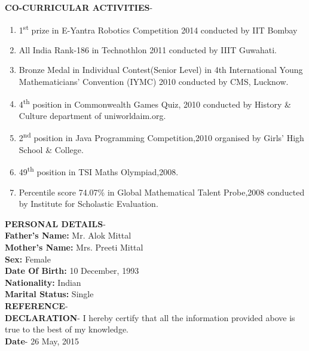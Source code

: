 \documentclass{article}
\begin{document}
	\textbf{CO-CURRICULAR ACTIVITIES}-
	\begin{enumerate}
		\item 1\textsuperscript{st} prize in E-Yantra Robotics Competition 2014 conducted by IIT Bombay
		\item All India Rank-186 in Technothlon 2011 conducted by IIIT Guwahati.
		\item Bronze Medal in Individual Contest(Senior Level) in 4th International Young Mathematicians' Convention (IYMC) 2010 conducted by CMS, Lucknow.
		\item 4\textsuperscript{th} position in Commonwealth Games Quiz, 2010 conducted by History & Culture department of uniworldaim.org.
		\item 2\textsuperscript{nd} position in Java Programming Competition,2010 organised by Girls' High School \& College.
		\item 49\textsuperscript{th} position in TSI Maths Olympiad,2008.
		\item Percentile score 74.07\% in Global Mathematical Talent Probe,2008 conducted by Institute for Scholastic Evaluation.\\[\baselineskip]
	\end{enumerate}
	\textbf{PERSONAL DETAILS}- \\
	\textbf{Father's Name:} Mr. Alok Mittal\\
	\textbf{Mother's Name:} Mrs. Preeti Mittal\\
	\textbf{Sex:} Female\\
	\textbf{Date Of Birth:} 10 December, 1993\\
	\textbf{Nationality:} Indian\\
	\textbf{Marital Status:} Single\\[\baselineskip]
	\textbf{REFERENCE}-
	\\[\baselineskip]
	\textbf{DECLARATION}- I hereby certify that all the information provided above is true to the best of my knowledge.
	\\[\baselineskip]
	\textbf{Date}- 26 May, 2015
\end{document}

